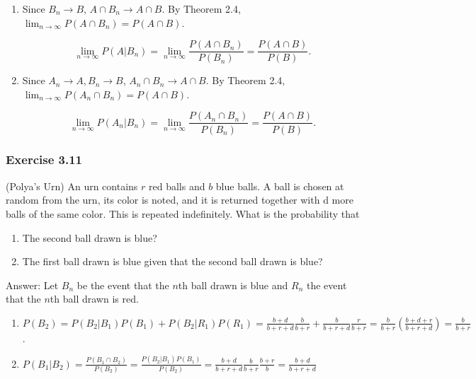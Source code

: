 \documentclass{article}
\begin{document}
{\begin{enumerate}
\item Since $B_n \rightarrow B$, $A \cap B_n \rightarrow A \cap B$. By Theorem 2.4, $\lim_{n\rightarrow \infty} P(A \cap B_n) = P(A\cap B)$.

$$
\lim_{n\rightarrow \infty} P(A \vert B_n) = \lim_{n\rightarrow \infty} \frac{P(A \cap B_n)}{P(B_n)} = \frac{P(A \cap B)}{P(B)}.
$$

\item Since $A_n \rightarrow A, B_n \rightarrow B$, $A_n \cap B _n\rightarrow A \cap B$. By Theorem 2.4, $\lim_{n\rightarrow \infty} P(A_n \cap B_n) = P(A\cap B)$.

$$
\lim_{n\rightarrow \infty} P(A_n \vert B_n) = \lim_{n\rightarrow \infty} \frac{P(A_n \cap B_n)}{P(B_n)} = \frac{P(A \cap B)}{P(B)}.
$$
\end{enumerate}

\subsubsection*{Exercise 3.11}

(Polya’s Urn) An urn contains $r$ red balls and $b$ blue balls. A ball is chosen at random from the urn, its color is noted, and it is returned together with d more balls of the same color. This is repeated indefinitely. What is
the probability that

\begin{enumerate}
\item The second ball drawn is blue?

\item The first ball drawn is blue given that the second ball drawn is blue?

\end{enumerate}

Answer: Let $B_n$ be the event that the $n$th ball drawn is blue and $R_n$ the event that the $n$th ball drawn is red.

\begin{enumerate}
\item $P(B_2) = P(B_2 \vert B_1)P(B_1) + P(B_2 \vert R_1)P(R_1) = \frac{b+d}{b+r+d}\frac{b}{b+r} + \frac{b}{b+r+d}\frac{r}{b+r} = \frac{b}{b+r}\left(\frac{b+d+r}{b+r+d}\right) = \frac{b}{b+r}$.

\item
$
P(B_1 \vert B_2) = \frac{P(B_1 \cap B_2)}{P(B_2)}
= \frac{P(B_2 \vert B_1)P(B_1)}{P(B_2)}
= \frac{b+d}{b+r+d}\frac{b}{b+r}\frac{b+r}{b}
= \frac{b+d}{b+r+d}
$
\end{enumerate}

}
\end{document}
